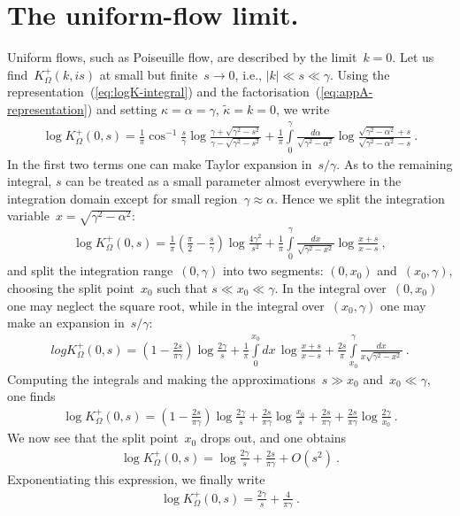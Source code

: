\documentclass[preprint,aps,eqsecnum, prb]{revtex4-1}
\newcommand{\fplus}[1]{{#1}^{+}}
\begin{document}
\section{The uniform-flow limit.}
\label{sec:k=0-limit}

Uniform flows, such as Poiseuille flow, are described by the limit~$k = 0$.
Let us find~$\fplus{K}_\Omega(k, is)$ at small but finite~$s \to 0$,
i.e., $|k| \ll s \ll \gamma$. Using the representation~(\ref{eq:logK-integral}) and the factorisation~(\ref{eq:appA-representation}) and setting
$\kappa = \alpha = \gamma$, $\tilde{\kappa} = k = 0$, we write
\begin{align}
\log \fplus{K}_\Omega(0, s) = \frac{1}{\pi} \cos^{-1}\frac{s}{\gamma}
\log\frac{\gamma + \sqrt{\gamma^2 - s^2}}{\gamma - \sqrt{\gamma^2 - s^2}}
+ \frac{1}{\pi} \int\limits_{0}^{\gamma}
      \frac{d\alpha}{\sqrt{\gamma^2 - \alpha^2}}
       \log\frac{\sqrt{\gamma^2 - \alpha^2} + s}{
                     \sqrt{\gamma^2 - \alpha^2 } - s}\ .
\end{align}
In the first two terms one can make Taylor expansion in~$s/\gamma$. As to the
remaining integral,  $s$ can be treated as a small parameter almost
everywhere in the integration domain except for
 small region~$\gamma \approx\alpha$. Hence we split the integration
 variable~$x = \sqrt{\gamma^2 - \alpha^2}$:
 \begin{align}
 \log \fplus{K}_\Omega(0, s) = \frac{1}{\pi} \left(\frac{\pi}{2} - \frac{s}{\gamma}\right) \log\frac{4 \gamma^2}{s^2}
 + \frac{1}{\pi} \int\limits_{0}^{\gamma}
 \frac{dx}{\sqrt{\gamma^2 - x^2}} \log\frac{x + s}{x - s}\ ,
 \end{align}
 and split the integration range~$(0, \gamma)$ into two segments: $(0, x_0)$
 and~$(x_0, \gamma)$, choosing the split point~$x_0$ such that
 $s \ll x_0 \ll \gamma$. In the integral over~$(0, x_0)$ one may
 neglect the square root, while in the integral over~$(x_0, \gamma)$
 one may make an expansion in~$s/\gamma$:
 \begin{align}
 log \fplus{K}_\Omega(0, s) = \left(1 - \frac{2s}{\pi\gamma}\right)
 \log\frac{2\gamma}{s}  + \frac{1}{\pi} \int\limits_{0}^{x_0}
 dx \, \log\frac{x + s}{x - s} + \frac{2s}{\pi} \int\limits_{x_0}^{\gamma}
 \frac{dx}{x\sqrt{\gamma^2 - x^2}}\ .
\end{align}
Computing the integrals and making the approximations~$s \gg x_0$
and~$x_0 \ll \gamma$, one finds
\begin{align}
\log \fplus{K}_\Omega(0, s) = \left(1 - \frac{2s}{\pi\gamma}\right)
\log\frac{2\gamma}{s}  +  \frac{2s}{\pi\gamma} \log \frac{x_0}{s}
+ \frac{2s}{\pi\gamma} + \frac{2s}{\pi\gamma} \log\frac{2\gamma}{x_0}\ .
\end{align}
We now see that the split point~$x_0$ drops out, and one obtains
\begin{align}
\log \fplus{K}_\Omega(0, s) = \log\frac{2\gamma}{s} + \frac{2s}{\pi\gamma}
+ O(s^2)\ .
\end{align}
Exponentiating this expression, we finally write
\begin{align}
\log\fplus{K}_\Omega(0, s) = \frac{2\gamma}{s} + \frac{4}{\pi\gamma}\ .
\end{align}
\end{document}
